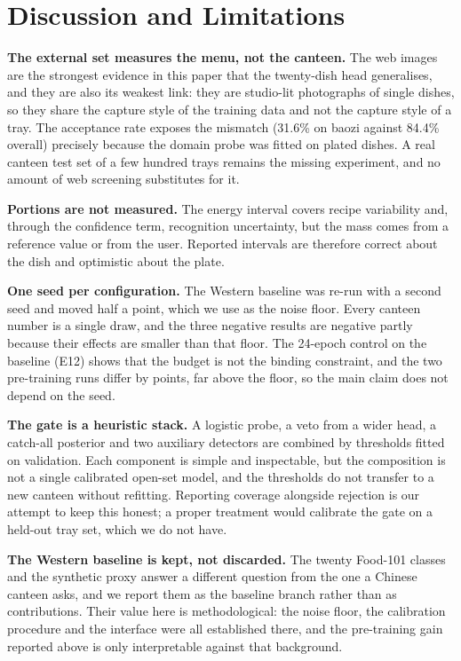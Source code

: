 \section{Discussion and Limitations}
\label{sec:lim}
\textbf{The external set measures the menu, not the canteen.} The \webN{} web
images are the strongest evidence in this paper that the twenty-dish head
generalises, and they are also its weakest link: they are studio-lit photographs
of single dishes, so they share the capture style of the training data and not the
capture style of a tray. The acceptance rate exposes the mismatch (31.6\% on
baozi against 84.4\% overall) precisely because the domain probe was fitted on
plated dishes. A real canteen test set of a few hundred trays remains the
missing experiment, and no amount of web screening substitutes for it.

\textbf{Portions are not measured.} The energy interval covers recipe variability
and, through the confidence term, recognition uncertainty, but the mass comes from
a reference value or from the user. Reported intervals are therefore correct
about the dish and optimistic about the plate.

\textbf{One seed per configuration.} The Western baseline was re-run with a second
seed and moved half a point, which we use as the noise floor. Every canteen
number is a single draw, and the three negative results are negative partly
because their effects are smaller than that floor. The 24-epoch control on the
baseline (E12) shows that the budget is not the binding constraint, and the two
pre-training runs differ by \cnGainPretrain{} points, far above the floor, so the
main claim does not depend on the seed.

\textbf{The gate is a heuristic stack.} A logistic probe, a veto from a wider
head, a catch-all posterior and two auxiliary detectors are combined by
thresholds fitted on validation. Each component is simple and inspectable, but
the composition is not a single calibrated open-set model, and the thresholds do
not transfer to a new canteen without refitting. Reporting coverage alongside
rejection is our attempt to keep this honest; a proper treatment would calibrate
the gate on a held-out tray set, which we do not have.

\textbf{The Western baseline is kept, not discarded.} The twenty Food-101 classes
and the synthetic proxy answer a different question from the one a Chinese
canteen asks, and we report them as the baseline branch rather than as
contributions. Their value here is methodological: the noise floor, the
calibration procedure and the interface were all established there, and the
pre-training gain reported above is only interpretable against that background.

